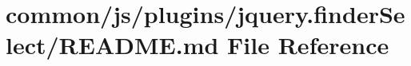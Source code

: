\hypertarget{common_2js_2plugins_2jquery_8finderSelect_2README_8md}{}\section{common/js/plugins/jquery.finder\+Select/\+R\+E\+A\+D\+M\+E.md File Reference}
\label{common_2js_2plugins_2jquery_8finderSelect_2README_8md}
